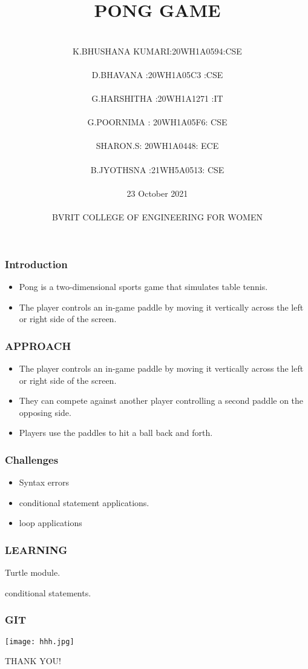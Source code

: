 \documentclass[12pt]{beamer}
\title{ PONG GAME }
\date{}
\author[Bvrith]{
  \\K.BHUSHANA KUMARI:20WH1A0594:CSE\\
  \\D.BHAVANA :20WH1A05C3  :CSE\\
  \\G.HARSHITHA :20WH1A1271 :IT\\ 
  \\G.POORNIMA : 20WH1A05F6: CSE\\
  \\SHARON.S:  20WH1A0448: ECE\\
  \\B.JYOTHSNA :21WH5A0513: CSE \\\vspace{1cm}
  \\23 October 2021\\
  \vspace{2cm} 
 \\ BVRIT COLLEGE OF ENGINEERING FOR WOMEN\\ 
 }
\begin{document}
 
\begin{frame} 
  \titlepage 
\end{frame} 
\begin{frame}
\frametitle{Introduction} 
  \begin{itemize}
      \item Pong is a two-dimensional sports game that simulates table tennis.\item The player controls an in-game paddle by moving it vertically across the left or right side of the screen.
  \end{itemize}
\end{frame}

\begin{frame} 
\frametitle{APPROACH} 
\begin{itemize}
  \item The player controls an in-game paddle by moving it vertically across the left or right side of the screen. \item They can compete against another player controlling a second paddle on the opposing side.\item Players use the paddles to hit a ball back and forth.   
\end{itemize}
\end{frame} 
\begin{frame} 
\frametitle{Challenges}
\begin{itemize}
    \item  Syntax errors \item conditional statement applications.\item loop applications
\end{itemize}
\end{frame}

\begin{frame}
\frametitle{LEARNING}
\begin{itemsize}
  \item Turtle module.\item conditional statements.
\end{itemsize}
\end{frame}

\begin{frame}
\frametitle{GIT}
\texttt{[image: hhh.jpg]}
\end{frame}

\begin{frame} 
\begin{center}
    THANK YOU!
\end{center} 
\end{frame}
\end{document}
